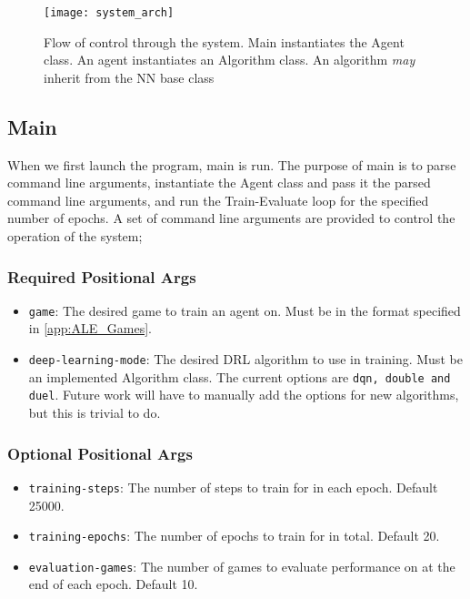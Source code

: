 \begin{figure}[h]
    \centering
    \texttt{[image: system\_arch]}
    \caption{Flow of control through the system. Main instantiates the Agent class. An agent instantiates an Algorithm class. An algorithm \textit{may} inherit from the NN base class}
    \label{fig:sys}
\end{figure}

\subsection{Main}
When we first launch the program, main is run. The purpose of main is to parse command line arguments, instantiate the Agent class and pass it the parsed command line arguments, and run the Train-Evaluate loop for the specified number of epochs. A set of command line arguments are provided to control the operation of the system;

\subsubsection{Required Positional Args}
\begin{itemize}
    \item \texttt{game}: The desired game to train an agent on. Must be in the format specified in \ref{app:ALE_Games}.
    \item \texttt{deep-learning-mode}: The desired DRL algorithm to use in training. Must be an implemented Algorithm class. The current options are \texttt{dqn, double and duel}. Future work will have to manually add the options for new algorithms, but this is trivial to do.
\end{itemize}

\subsubsection{Optional Positional Args}
\begin{itemize}
    \item \texttt{training-steps}: The number of steps to train for in each epoch. Default 25000.
    \item \texttt{training-epochs}: The number of epochs to train for in total. Default 20.
    \item \texttt{evaluation-games}: The number of games to evaluate performance on at the end of each epoch. Default 10.
\end{itemize}

